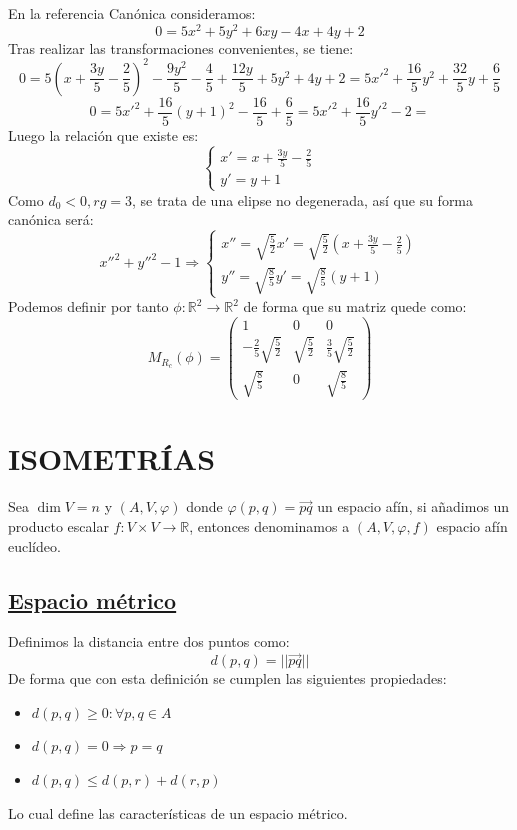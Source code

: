\documentclass[10pt,a4paper,openright]{book}
\begin{document}
En la referencia Canónica consideramos:
$$0 = 5x^2 + 5y^2 + 6xy - 4x + 4y + 2$$
Tras realizar las transformaciones convenientes, se tiene:
$$0 =5 (x + \frac{3y}{5} - \frac{2}{5})^2 - \frac{9y^2}{5} - \frac{4}{5} + \frac{12y}{5} + 5y^2 + 4y + 2 = 5x'^2 + \frac{16}{5} y^2 + \frac{32}{5} y + \frac{6}{5}$$
$$0 = 5x'^2 + \frac{16}{5} (y + 1)^2 - \frac{16}{5} + \frac{6}{5} = 5x'^2 + \frac{16}{5} y'^2 - 2 = $$
Luego la relación que existe es:
$$\begin{cases} x' = x + \frac{3y}{5} - \frac{2}{5} \\ y' = y + 1 \end{cases}$$
Como $ d_0 < 0, rg = 3$, se trata de una elipse no degenerada, así que su forma canónica será:
$$x''^2 + y''^2 - 1 \Rightarrow \begin{cases} x'' = \sqrt{\frac{5}{2}} x' =  \sqrt{\frac{5}{2}} (x + \frac{3y}{5} - \frac{2}{5})  \\ y'' = \sqrt{\frac{8}{5}} y' = \sqrt{\frac{8}{5}} (y+1)\end{cases}$$
Podemos definir por tanto $\phi : \mathbb{R}^2 \to  \mathbb{R}^2$ de forma que su matriz quede como:
$$M_{R_c} (\phi)= \left(\begin{array}{c|cc}
1 & 0 & 0 \\
\hline
- \frac{2}{5}\sqrt{\frac{5}{2}}  & \sqrt{\frac{5}{2}}  & \frac{3}{5}\sqrt{\frac{5}{2}}  \\
\sqrt{\frac{8}{5}} &  0 & \sqrt{\frac{8}{5}}
\end{array}
\right) $$

\newpage
\section*{ISOMETRÍAS}
Sea $\dim V = n$ y $(A, V, \varphi)$ donde $\varphi(p,q) = \vec{pq}$ un espacio afín, si añadimos un producto escalar $f: V \times V \rightarrow \mathbb R$, entonces denominamos a $(A,V,\varphi, f)$ espacio afín euclídeo.

\subsection*{\underline{Espacio métrico}}
Definimos la distancia entre dos puntos como:
$$d(p,q) = ||\vec{pq}||$$
De forma que con esta definición se cumplen las siguientes propiedades:
\begin{itemize}
\item $d(p,q) \geq 0 : \forall p,q\in A$
\item $d(p,q) = 0\Rightarrow p = q$
\item $d(p,q) \leq d(p,r) + d(r,p)$
\end{itemize}
Lo cual define las características de un espacio métrico.
\end{document}
